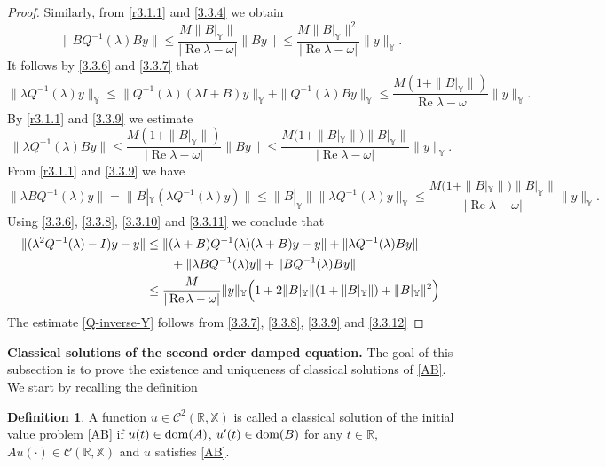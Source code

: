 \documentclass[11pt]{amsart}
\numberwithin{equation}{section}
\newcommand{\RR}{{\mathbb R}}
\theoremstyle{remark}
\theoremstyle{definition}
\newtheorem{definition}[theorem]{Definition}
\newcommand\bX{{\mathbb X}}
\newcommand\bY{{\mathbb Y}}
\newcommand{\dom}{\text{\rm{dom}}}
\begin{document}
\begin{proof}
	Similarly, from \eqref{r3.1.1} and \eqref{3.3.4} we obtain
	\begin{equation}\label{3.3.8}
		\|BQ^{-1}(\lambda)By\|
		\leq \frac{M\|B|_\bY\|}{|\operatorname{Re}\lambda - \omega|}\|By\|
		\leq \frac{M\|B|_\bY\|^2}{|\operatorname{Re}\lambda - \omega|}\|y\|_\bY.
	\end{equation}
It follows	by \eqref{3.3.6} and \eqref{3.3.7} that
	\begin{equation}\label{3.3.9}
		\|\lambda Q^{-1}(\lambda)y\|_\bY
		\leq \|Q^{-1}(\lambda)(\lambda I+B)y\|_\bY + \|Q^{-1}(\lambda)By\|_\bY
		\leq \frac{M(1+\|B|_\bY\|)}{|\operatorname{Re}\lambda - \omega|}\|y\|_\bY.
	\end{equation}
	By \eqref{r3.1.1} and \eqref{3.3.9} we estimate 
	\begin{equation}\label{3.3.10}
		\|\lambda Q^{-1}(\lambda)By\|
		\leq \frac{M(1+\|B|_\bY\|)}{|\operatorname{Re}\lambda - \omega|}\|By\|\leq \frac{M(1+\|B|_\bY\|)\|B|_\bY\|}{|\operatorname{Re}\lambda - \omega|}\|y\|_\bY.
	\end{equation}
	From \eqref{r3.1.1} and \eqref{3.3.9} we have
	\begin{equation}\label{3.3.11}
		\|\lambda BQ^{-1}(\lambda)y\|
		= \|B|_\bY(\lambda Q^{-1}(\lambda)y)\| \leq \|B|_\bY\|\|\lambda Q^{-1}(\lambda)y\|_\bY
		\leq \frac{M(1+\|B|_\bY\|)\|B|_\bY\|}{|\operatorname{Re}\lambda - \omega|}\|y\|_\bY. 
	\end{equation}
	Using \eqref{3.3.6}, \eqref{3.3.8}, \eqref{3.3.10} and \eqref{3.3.11} we conclude that 
	\begin{align}\label{3.3.12}
		\|(\lambda^2 Q^{-1}(\lambda) - I)y - y\|
		&\leq \|(\lambda+B)Q^{-1}(\lambda)(\lambda+B)y - y\|
		+ \|\lambda Q^{-1}(\lambda)By\| \nonumber\\
		&\qquad + \|\lambda BQ^{-1}(\lambda)y\| + \|BQ^{-1}(\lambda)By\| \nonumber\\
		&\leq \frac{M}{|\operatorname{Re}\lambda - \omega|}\|y\|_\bY
		\Bigl(1 + 2\|B|_\bY\|(1+\|B|_\bY\|) + \|B|_\bY\|^2\Bigr)
	\end{align}
	The estimate \eqref{Q-inverse-Y} follows from \eqref{3.3.7}, \eqref{3.3.8}, \eqref{3.3.9} and \eqref{3.3.12}
\end{proof}
\noindent\textbf{Classical solutions of the second order damped equation.}
The goal of this subsection is to prove the existence and uniqueness of classical solutions of \eqref{AB}. We start by recalling the definition 
\begin{definition}\label{d3.1}
	A function $u\in\mathcal{C}^2(\RR,\bX)$ is called a classical solution of the initial value problem \eqref{AB} if $u(t)\in\dom(A)$, $u'(t)\in\dom(B)$ for any $t\in\RR$, $Au(\cdot)\in\mathcal{C}(\RR,\bX)$ and $u$ satisfies  \eqref{AB}.
\end{definition}
\end{document}
